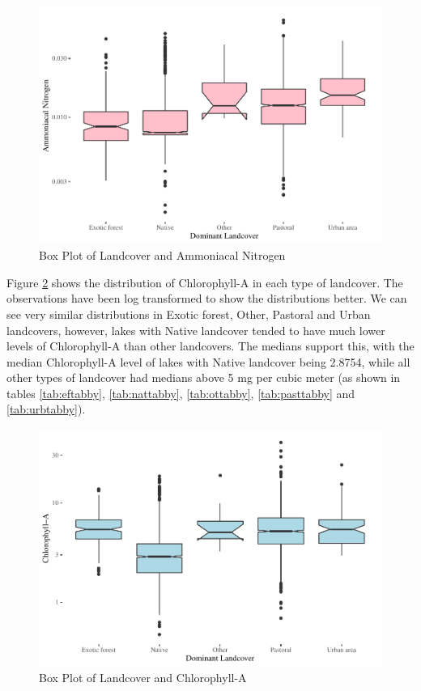 \documentclass[
]{article}
\begin{document}
\begin{figure}
\centering
\includegraphics{Final-Report_files/figure-latex/boxNH4N-1.pdf}
\caption{\label{fig:boxNH4N}Box Plot of Landcover and Ammoniacal Nitrogen}
\end{figure}

Figure \ref{fig:boxCHLA} shows the distribution of Chlorophyll-A in each type of landcover. The observations have been log transformed to show the distributions better. We can see very similar distributions in Exotic forest, Other, Pastoral and Urban landcovers, however, lakes with Native landcover tended to have much lower levels of Chlorophyll-A than other landcovers. The medians support this, with the median Chlorophyll-A level of lakes with Native landcover being 2.8754, while all other types of landcover had medians above 5 mg per cubic meter (as shown in tables \ref{tab:eftabby}, \ref{tab:nattabby}, \ref{tab:ottabby}, \ref{tab:pasttabby} and \ref{tab:urbtabby}).

\begin{figure}
\centering
\includegraphics{Final-Report_files/figure-latex/boxCHLA-1.pdf}
\caption{\label{fig:boxCHLA}Box Plot of Landcover and Chlorophyll-A}
\end{figure}
\end{document}
